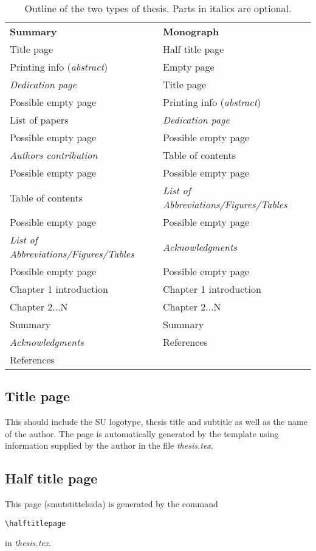 \begin{table}[htbp]
\begin{tabular}{|l|l|}
\hline
\textbf{Summary} & \textbf{Monograph} \\
Title page & Half title page \\
Printing info (\emph{abstract}) & Empty page \\
\emph{Dedication page} & Title page \\
Possible empty page & Printing info (\emph{abstract}) \\
List of papers & \emph{Dedication page} \\
Possible empty page & Possible empty page \\
\emph{Authors contribution} & Table of contents \\
Possible empty page & Possible empty page \\
Table of contents & \emph{List of Abbreviations/Figures/Tables} \\
Possible empty page & Possible empty page \\
\emph{List of Abbreviations/Figures/Tables}  & \emph{Acknowledgments} \\
Possible empty page & Possible empty page \\
Chapter 1 introduction & Chapter 1 introduction\\
Chapter 2...N & Chapter 2...N\\
Summary & Summary \\
\emph{Acknowledgments} & References \\
References & \\
\hline

\end{tabular}
\caption{\label{tab:outline}Outline of the two types of thesis. Parts in italics are optional.}
\end{table}

\subsection{Title page}
This should include the SU logotype, thesis title and subtitle as well as the name of the author. The page is automatically generated by the template using information supplied by the author in the file \emph{thesis.tex}.

\subsection{Half title page}
This page (smutstittelsida) is generated by the command 
\begin{verbatim}
\halftitlepage
\end{verbatim}
in \emph{thesis.tex}.

